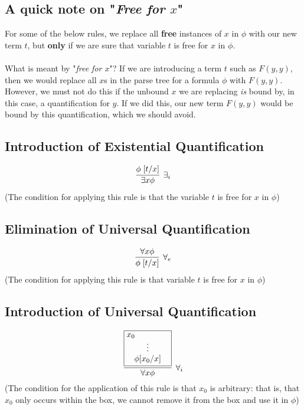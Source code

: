 \documentclass{article}
\newcommand{\rulename}[1]{#1}
\newcommand{\hint}[1]{#1}
\newcommand{\myex}[2]{\exists #1 #2}
\newcommand{\myall}[2]{\forall #1 #2}
\begin{document}
\subsection*{A quick note on "\textit{Free for $x$}"}
For some of the below rules, we replace all \textbf{free} instances of $x$ in $\phi$ with our new term $t$, but \textbf{only} if we are sure that variable $t$ is free for $x$ in $\phi$. 
    \\\\What is meant by "\textit{free for $x$}"? If we are introducing a term $t$ such as $F(y,y)$, then we would replace all $x$s in the parse tree for a formula $\phi$ with $F(y,y)$. However, we must not do this if the unbound $x$ we are replacing \textit{is} bound by, in this case, a quantification for $y$. If we did this, our new term $F(y,y)$ would be bound by this quantification, which we should avoid.
\subsection*{Introduction of Existential Quantification}
    \begin{align*}
      \infer[\rulename{\exists_i}]
      {\myex{x}{\phi}}
      {\phi\;[t/x]}
    \end{align*}
    (The condition for applying this rule is that the variable $t$ is free for $x$ in $\phi$) %

\subsection*{Elimination of Universal Quantification}
    \begin{align*}
      \infer[\rulename{\forall_e}]
      {\phi\;[t/x]}
      {\myall{x}{\phi}}
    \end{align*}
    (The condition for applying this rule is that variable $t$ is free for $x$ in $\phi$)
\subsection*{Introduction of Universal Quantification}
    \begin{equation*}
      \infer[\rulename{\forall_i}]
      {\forall x \phi}
      {
        \framebox{\parbox{1.8cm}{\hint{$x_0$}
        \centerline{\vdots}
        \centerline{$\phi[x_0/x]$}}}
      }
    \end{equation*}
    (The condition for the application of this rule is that $x_0$ is arbitrary: that is, that $x_0$ only occurs within the box, we cannot remove it from the box and use it in $\phi$)
    
\end{document}
